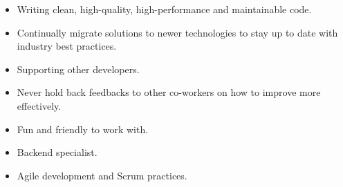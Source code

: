 %
%
%

{}
\begin{skills}
\end{skills}

\begin{itemize}
	\item Writing clean, high-quality, high-performance and maintainable code.
	\item Continually migrate solutions to newer technologies to stay up to date with industry best practices.     
    	\item Supporting other developers.
	\item Never hold back feedbacks to other co-workers on how to improve more effectively.
	\item Fun and friendly to work with.
	\item Backend specialist.
	\item Agile development and Scrum practices.
\end{itemize}

\vspace{1em}


